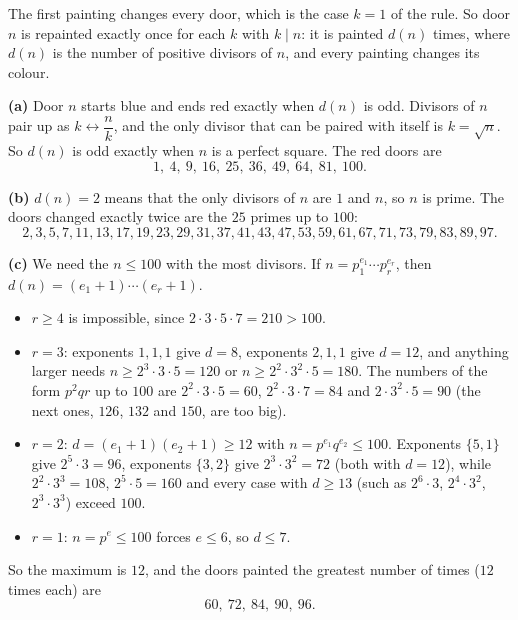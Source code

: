 The first painting changes every door, which is the case $k=1$ of the rule. So door $n$ is repainted exactly once for each $k$ with $k\mid n$: it is painted $d(n)$ times, where $d(n)$ is the number of positive divisors of $n$, and every painting changes its colour.

\textbf{(a)} Door $n$ starts blue and ends red exactly when $d(n)$ is odd. Divisors of $n$ pair up as $k\leftrightarrow\dfrac {n}{k}$, and the only divisor that can be paired with itself is $k=\sqrt n$. So $d(n)$ is odd exactly when $n$ is a perfect square. The red doors are
\[\boxed{1,\ 4,\ 9,\ 16,\ 25,\ 36,\ 49,\ 64,\ 81,\ 100}.\]

\textbf{(b)} $d(n)=2$ means that the only divisors of $n$ are $1$ and $n$, so $n$ is prime. The doors changed exactly twice are the $25$ primes up to $100$:
\[\boxed{2,3,5,7,11,13,17,19,23,29,31,37,41,43,47,53,59,61,67,71,73,79,83,89,97}.\]

\textbf{(c)} We need the $n\le100$ with the most divisors. If $n=p_1^{e_1}\cdots p_r^{e_r}$, then $d(n)=(e_1+1)\cdots(e_r+1)$.
\begin{itemize}
\item $r\ge4$ is impossible, since $2\cdot3\cdot5\cdot7=210>100$.
\item $r=3$: exponents $1,1,1$ give $d=8$, exponents $2,1,1$ give $d=12$, and anything larger needs $n\ge2^3\cdot3\cdot5=120$ or $n\ge2^2\cdot3^2\cdot5=180$. The numbers of the form $p^2qr$ up to $100$ are $2^2\cdot3\cdot5=60$, $2^2\cdot3\cdot7=84$ and $2\cdot3^2\cdot5=90$ (the next ones, $126$, $132$ and $150$, are too big).
\item $r=2$: $d=(e_1+1)(e_2+1)\ge12$ with $n=p^{e_1}q^{e_2}\le100$. Exponents $\{5,1\}$ give $2^5\cdot3=96$, exponents $\{3,2\}$ give $2^3\cdot3^2=72$ (both with $d=12$), while $2^2\cdot3^3=108$, $2^5\cdot5=160$ and every case with $d\ge13$ (such as $2^6\cdot3$, $2^4\cdot3^2$, $2^3\cdot3^3$) exceed $100$.
\item $r=1$: $n=p^e\le100$ forces $e\le6$, so $d\le7$.
\end{itemize}
So the maximum is $12$, and the doors painted the greatest number of times ($12$ times each) are
\[\boxed{60,\ 72,\ 84,\ 90,\ 96}.\]
